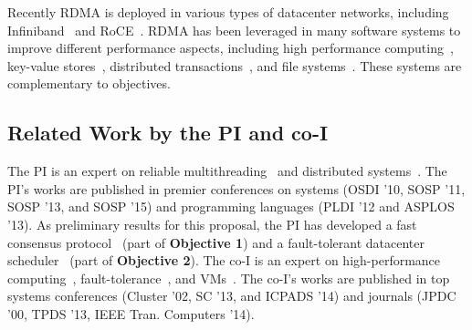  Recently RDMA is deployed in various types of 
datacenter networks, including Infiniband~\cite{infiniband} and 
RoCE~\cite{roce}. RDMA has been leveraged in many 
software systems to improve different performance aspects, including high 
performance computing~\cite{openmpi}, key-value 
stores~\cite{pilaf:usenix14,herd:sigcomm14,farm:nsdi14,memcached:rdma}, 
distributed transactions~\cite{drtm:sosp15,farm:sosp15}, and file 
systems~\cite{gibson:nfs}. These systems are complementary to \xxx objectives.

\vspace{-.15in}\subsection{Related Work by the PI and co-I} 
\label{sec:my-work}\vspace{-.075in}
% 

The PI is an expert on reliable multithreading~\cite{smt:cacm, 
cui:tern:osdi10, peregrine:sosp11, parrot:sosp13} and
distributed systems~\cite{crane:sosp15, 
tripod:apsys16}. The 
PI's works are published in premier conferences on systems (OSDI '10, 
SOSP '11, SOSP '13, and SOSP '15) and programming languages (PLDI '12 and 
ASPLOS '13). As preliminary results for this \xxx proposal, the PI has 
developed a fast consensus protocol~\cite{crane:sosp15} (part of 
\textbf{Objective 1}) and a fault-tolerant datacenter 
scheduler~\cite{tripod:apsys16} (part of \textbf{Objective 2}). The co-I is an 
expert on high-performance 
computing~\cite{powerrock,hwang,jessica,cheung,khokhar}, fault-tolerance~\cite{ 
sheng,shengdi1}, and VMs~\cite{rhymes,shengdi,jessica2}. The 
co-I's works are published in top systems conferences (Cluster '02, SC '13, 
and ICPADS '14) and journals (JPDC '00, TPDS '13, IEEE Tran. Computers '14).


